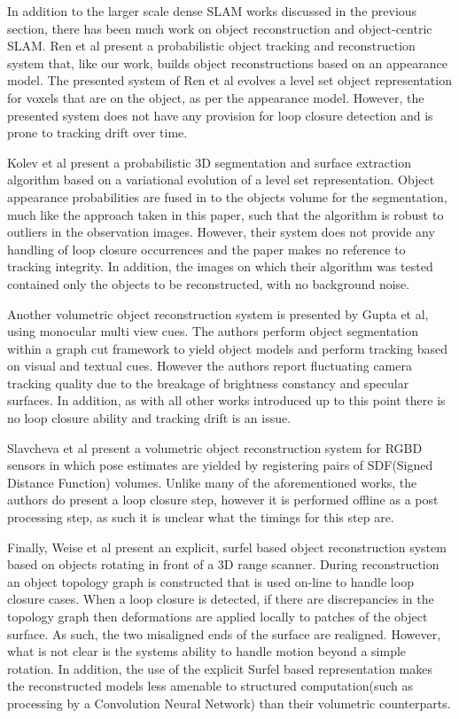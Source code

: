 In addition to the larger scale dense SLAM works discussed in the previous section, there has been much work on object reconstruction and 
object-centric SLAM. Ren et al present a probabilistic object tracking and reconstruction system\cite{Ren2013}  that, like our work, builds 
object reconstructions based on an appearance model. The presented system of Ren et al  evolves a level set object representation for voxels that 
are on the object, as per the appearance model. However, the presented system does not have any provision for loop closure detection and 
is prone to tracking drift over time.

Kolev et al present a probabilistic 3D segmentation and surface extraction algorithm\cite{Kolev2006} based on a variational evolution of a level 
set representation. Object appearance probabilities are fused in to the objects volume for the segmentation, much like the approach taken in 
this paper, such that the algorithm is robust to outliers in the observation images. However, their system does not provide any handling of 
loop closure occurrences and the paper makes no reference to tracking integrity. In addition, the images on which their algorithm was tested 
contained only the objects to be reconstructed, with no background noise.

Another volumetric object reconstruction system is presented by Gupta et al\cite{Gupta2016}, using monocular multi view cues. The authors 
perform object segmentation within a graph cut framework to yield object models and perform tracking based on visual and textual cues. 
However the authors report fluctuating camera tracking quality due to the breakage of brightness constancy and specular surfaces. In addition, 
as with all other works introduced up to this point there is no loop closure ability and tracking drift is an issue.

Slavcheva et al present a volumetric object reconstruction system for RGBD sensors in which pose estimates are yielded by registering pairs of 
SDF(Signed Distance Function) volumes. Unlike many of the aforementioned works, the authors do present a loop closure step, however it is 
performed offline as a post processing step, as such it is unclear what the timings for this step are.

Finally, Weise et al present an explicit, surfel based object reconstruction system\cite{Weise2009} based on objects rotating in front of a 3D 
range scanner. During reconstruction an object topology graph is constructed that is used on-line to handle loop closure cases. When a loop 
closure is detected, if there are discrepancies in the topology graph then deformations are applied locally to patches of the object surface. As 
such, the two misaligned ends of the surface are realigned. However, what is not clear is the systems ability to handle motion beyond a simple 
rotation. In addition, the use of the explicit Surfel based representation makes the reconstructed models less amenable to structured  computation(such as processing by a Convolution Neural Network) than their volumetric counterparts.